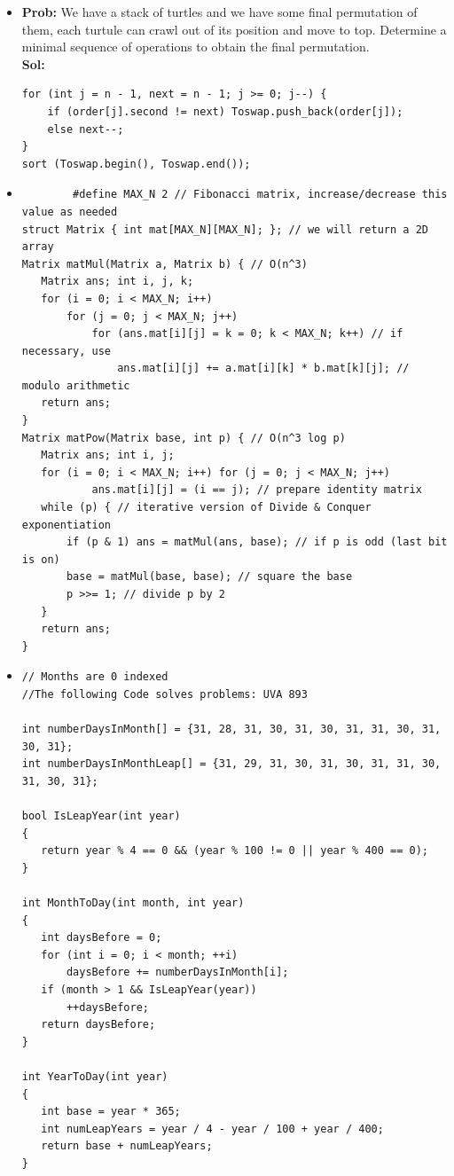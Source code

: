 \documentclass[8pt, a4paper, oneside, twocolumn]{extarticle}
\begin{document}
\begin{itemize}
\begin{verbatim}
    \end{verbatim}
    \item \textbf{Prob: }We have a stack of turtles and we have some final permutation of them, each turtule can crawl out of its position and move to top. Determine a minimal sequence of operations to obtain the final permutation.\\\textbf{Sol: }
    \begin{verbatim}
for (int j = n - 1, next = n - 1; j >= 0; j--) {
    if (order[j].second != next) Toswap.push_back(order[j]);
    else next--;
}
sort (Toswap.begin(), Toswap.end());
\end{verbatim}
    \item \begin{verbatim}
        #define MAX_N 2 // Fibonacci matrix, increase/decrease this value as needed
struct Matrix { int mat[MAX_N][MAX_N]; }; // we will return a 2D array
Matrix matMul(Matrix a, Matrix b) { // O(n^3)
   Matrix ans; int i, j, k;
   for (i = 0; i < MAX_N; i++)
       for (j = 0; j < MAX_N; j++)
           for (ans.mat[i][j] = k = 0; k < MAX_N; k++) // if necessary, use
               ans.mat[i][j] += a.mat[i][k] * b.mat[k][j]; // modulo arithmetic
   return ans;
}
Matrix matPow(Matrix base, int p) { // O(n^3 log p)
   Matrix ans; int i, j;
   for (i = 0; i < MAX_N; i++) for (j = 0; j < MAX_N; j++)
           ans.mat[i][j] = (i == j); // prepare identity matrix
   while (p) { // iterative version of Divide & Conquer exponentiation
       if (p & 1) ans = matMul(ans, base); // if p is odd (last bit is on)
       base = matMul(base, base); // square the base
       p >>= 1; // divide p by 2
   }
   return ans;
}
    \end{verbatim}
    \item \begin{verbatim}
// Months are 0 indexed
//The following Code solves problems: UVA 893 

int numberDaysInMonth[] = {31, 28, 31, 30, 31, 30, 31, 31, 30, 31, 30, 31};
int numberDaysInMonthLeap[] = {31, 29, 31, 30, 31, 30, 31, 31, 30, 31, 30, 31};

bool IsLeapYear(int year)
{
   return year % 4 == 0 && (year % 100 != 0 || year % 400 == 0);
}

int MonthToDay(int month, int year)
{
   int daysBefore = 0;
   for (int i = 0; i < month; ++i)
       daysBefore += numberDaysInMonth[i];
   if (month > 1 && IsLeapYear(year))
       ++daysBefore;
   return daysBefore;
}

int YearToDay(int year)
{
   int base = year * 365;
   int numLeapYears = year / 4 - year / 100 + year / 400;
   return base + numLeapYears;
}


\end{verbatim}
\end{itemize}
\end{document}
